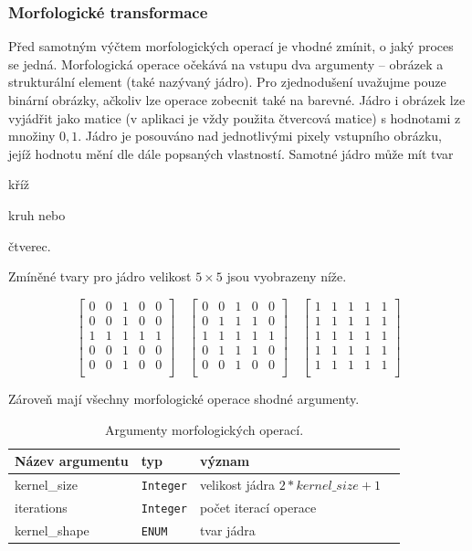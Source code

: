 \documentclass[
  field=ainfp,
  master=true,
  biblatex,
  sourcecodes=false,
  theorems=false,
  glossaries,
  index
]{kidiplom}
\begin{document}
\subsubsection*{Morfologické transformace}
Před samotným výčtem morfologických operací je vhodné zmínit, o jaký proces se jedná. Morfologická operace očekává na vstupu dva argumenty -- obrázek a strukturální element (také nazývaný jádro). Pro zjednodušení uvažujme pouze binární obrázky, ačkoliv lze operace zobecnit také na barevné. Jádro i obrázek lze vyjádřit jako matice (v aplikaci je vždy použita čtvercová matice) s hodnotami z množiny $ {0, 1} $. Jádro je posouváno nad jednotlivými pixely vstupního obrázku, jejíž hodnotu mění dle dále popsaných vlastností. Samotné jádro může mít tvar 
\begin{enumerate*}[label={\alph*)}]
\item kříž
\item kruh nebo
\item čtverec.
\end{enumerate*}
Zmíněné tvary pro jádro velikost $5 \times 5$ jsou vyobrazeny níže.

$$
\begin{bmatrix} 
0 & 0 & 1 & 0 & 0 \\
0 & 0 & 1 & 0 & 0 \\
1 & 1 & 1 & 1 & 1 \\
0 & 0 & 1 & 0 & 0 \\
0 & 0 & 1 & 0 & 0 \\
\end{bmatrix}
\quad
\begin{bmatrix} 
0 & 0 & 1 & 0 & 0 \\
0 & 1 & 1 & 1 & 0 \\
1 & 1 & 1 & 1 & 1 \\
0 & 1 & 1 & 1 & 0 \\
0 & 0 & 1 & 0 & 0 \\
\end{bmatrix}
\quad
\begin{bmatrix} 
1 & 1 & 1 & 1 & 1 \\
1 & 1 & 1 & 1 & 1 \\
1 & 1 & 1 & 1 & 1 \\
1 & 1 & 1 & 1 & 1 \\
1 & 1 & 1 & 1 & 1 \\
\end{bmatrix}
$$

Zároveň mají všechny morfologické operace shodné argumenty.


\begin{table}[H]
\centering
\begin{tabular}{|l|l|l|l|}
\hline
\textbf{Název argumentu} & \textbf{typ} & \textbf{význam}
\\ \hline
kernel\_size & \texttt{Integer} & velikost jádra $2 * kernel\_size + 1$
\\ \hline
iterations & \texttt{Integer} & počet iterací operace
\\ \hline
kernel\_shape & \texttt{ENUM}  & tvar jádra
\\ \hline
\end{tabular}
\caption{Argumenty morfologických operací.}
\end{table}
\end{document}
